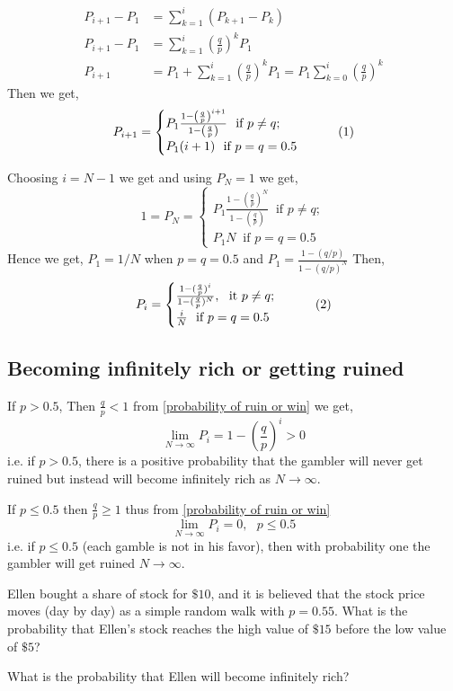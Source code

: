 \begin{align*}
    P_{i+1} -P_{1} &= \sum_{k=1}^{i} (P_{k+1}-P_{k})\\ 
    P_{i+1} -P_{1} &= \sum_{k=1}^{i}\left(\frac{q}{p}\right)^{k}P_{1}  \\
    P_{i+1} &= P_{1} + \sum_{k=1}^{i}\left(\frac{q}{p}\right)^{k}P_{1} =  P_{1}\sum_{k=0}^{i}\left( \frac{q}{p} \right)^k
\end{align*}
Then we get, 
\[
            P_{i+1}  =  \begin{cases}
                P_{1}\frac{1-\left(\frac{q}{p}\right)^{i+1}}{1-\left(\frac{q}{p}\right)} \ \text{ if } p\neq q;\\ 
                P_{1}(i+1) \ \text{ if } p=q=0.5
            \end{cases} \numberthis
\]

Choosing $ i=N-1 $ we get and using  $ P_{N} =1 $ we get,
\[
    1=P_{N}=
    \begin{cases}
        P_{1}\frac{1-\left(\frac{q}{p}\right)^{N}}{1-\left(\frac{q}{p}\right)} \ \text{ if } p\neq q;\\ 
        P_{1}N \ \text{ if } p=q=0.5
    \end{cases}
\]
Hence we get, $ P_{1} = 1/N $ when $ p=q=0.5 $ and  $ P_{1} = \frac{1-(q/p)}{1-(q/p)^{N}} $ Then,
\[
    P_{i}=
    \begin{cases}
        \frac{1-(\frac{q}{p})^{i}}{1-(\frac{q}{p})^{N}}, \ \text{ it } p\neq q;\\ 
        \frac{i}{N} \ \text{ if } p=q=0.5 
    \end{cases} \numberthis \label{probability of ruin or win}
\]

\subsection{Becoming infinitely rich or getting ruined}
If $ p>0.5 $, Then  $ \frac{q}{p}<1 $ from \cref{probability of ruin or win} we get,
\[
    \lim_{N \to \infty} P_{i} = 1-\left(\frac{q}{p}\right)^{i} >0 
\]
i.e. if $ p>0.5 $, there is a positive probability that the gambler will never get ruined but instead will become infinitely rich as $ N\to \infty $.

If $p\le 0.5$ then $ \frac{q}{p}\ge 1 $ thus from \cref{probability of ruin or win}
\[
    \lim_{N \to \infty} P_{i} = 0, \ \ \ p\le 0.5
\]
i.e. if $p \le 0.5$ (each gamble is not in his favor), then with probability one the gambler will get ruined $ N\to \infty $.

\begin{example}
    Ellen bought a share of stock for $\$10$, and it is believed that the stock price moves (day by day) 
    as a simple random walk with $p = 0.55$. What is the probability that Ellen's
    stock reaches the high value of $\$15$ before the low value of $\$5$? 

    What is the probability that Ellen will become infinitely rich?
\end{example}


